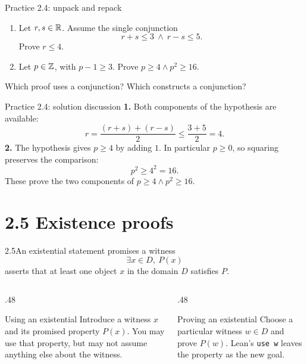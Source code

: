 \begin{frame}{Practice 2.4: unpack and repack}
\begin{enumerate}
\item Let $r,s\in\mathbb{R}$. Assume the single conjunction
\[
r+s\le3\ \land\ r-s\le5.
\]
Prove $r\le4$.
\item Let $p\in\mathbb{Z}$, with $p-1\ge3$. Prove $p\ge4\land p^2\ge16$.
\end{enumerate}
Which proof uses a conjunction? Which constructs a conjunction?
\end{frame}

\begin{frame}{Practice 2.4: solution discussion}
\textbf{1.} Both components of the hypothesis are available:
\[
r=\frac{(r+s)+(r-s)}2\le\frac{3+5}2=4.
\]
\textbf{2.} The hypothesis gives $p\ge4$ by adding $1$.
In particular $p\ge0$, so squaring preserves the comparison:
\[
p^2\ge4^2=16.
\]
These prove the two components of $p\ge4\land p^2\ge16$.
\end{frame}

\section{2.5 Existence proofs}
\begin{frame}{2.5\quad An existential statement promises a witness}
\[
\exists x\in D,\ P(x)
\]
asserts that at least one object $x$ in the domain $D$ satisfies $P$.
\begin{columns}[T]
\begin{column}{.48\textwidth}
\begin{block}{Using an existential}
Introduce a witness $x$ and its promised property $P(x)$.
You may use that property, but may not assume anything else about the witness.
\end{block}
\end{column}
\begin{column}{.48\textwidth}
\begin{block}{Proving an existential}
Choose a particular witness $w\in D$ and prove $P(w)$.
Lean's \texttt{use w} leaves the property as the new goal.
\end{block}
\end{column}
\end{columns}
\end{frame}

